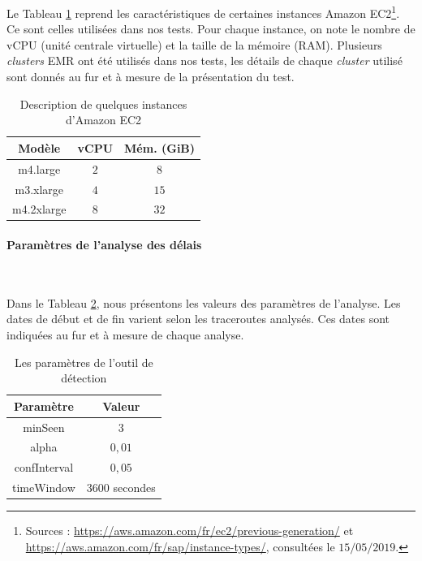 Le Tableau \ref{instances-types-description} reprend  les caractéristiques de certaines instances Amazon EC2\footnote{Sources : \url{https://aws.amazon.com/fr/ec2/previous-generation/} et \url{https://aws.amazon.com/fr/sap/instance-types/}, consultées le $15/05/2019$.}. Ce sont celles utilisées dans nos tests. Pour chaque instance, on note le nombre de vCPU (unité centrale virtuelle) et la taille de la mémoire (RAM). Plusieurs \textit{clusters} EMR ont été utilisés dans nos tests, les détails de chaque  \textit{cluster} utilisé sont donnés au fur et à mesure de la présentation du test.
\begin{table}[H]
	\centering
	\begin{tabular}{c c c}
		\hline 
		\textbf{Modèle} &	\textbf{vCPU} &\textbf{	Mém. (GiB)} \\ 
		\hline 
		m4.large&	$ 2 $&	$ 8 $ \\
		\hline 
		m3.xlarge&	$ 4 $&	$ 15 $\\
		\hline 
		m4.2xlarge&	$8  $&	$ 32 $ \\ 
		\hline 
	\end{tabular}
	\caption{Description de quelques instances d'Amazon EC2}
	\label{instances-types-description}
\end{table}

\paragraph{Paramètres de l'analyse des délais}~

 Dans le Tableau \ref{params-detection}, nous présentons les valeurs des paramètres de l'analyse. Les dates de début et de fin  varient selon les traceroutes analysés. Ces dates sont indiquées au fur et à mesure de chaque analyse.

\begin{table}[h]
	\centering
	\begin{tabular}{c c }
		\hline 
	\textbf{Paramètre}	& \textbf{Valeur}  \\ 
		\hline 
	minSeen	& $ 3 $ \\ 
		\hline 
	alpha	&  $ 0,01 $\\ 
		\hline 
	confInterval	& $0,05$ \\ 
		\hline 
	timeWindow	&  $ 3600 $ secondes \\ 
		\hline 
	\end{tabular} 
\caption{Les paramètres  de l'outil de détection}
\label{params-detection}
\end{table}



